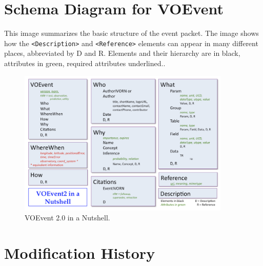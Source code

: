 \documentclass[11pt,a4paper]{ivoa}
\begin{document}
\section{Schema Diagram for VOEvent}
\label{sec:5}
This image summarizes the basic structure of the event packet. The image shows how the {\tt <Description>} and {\tt <Reference>} elements can appear in many different places, abbreviated by D and R. Elements and their hierarchy are in black, attributes in green, required attributes underlined.. 
\begin{figure}[th]
\begin{center}
\includegraphics[width=0.9\textwidth]{nutshell.png} \end{center}
\caption{VOEvent 2.0 in a Nutshell.}
\label{fig:nutshell}
\end{figure}





\appendix

\section{Modification History}
\end{document}
